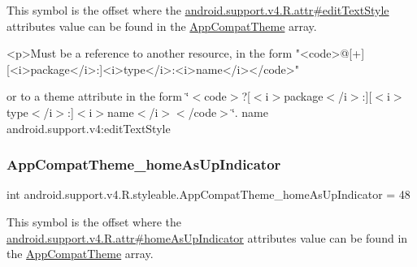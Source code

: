 This symbol is the offset where the \hyperlink{classandroid_1_1support_1_1v4_1_1R_1_1attr_a2a44b95ba45feb6b9848f66f16044f7d}{android.\+support.\+v4.\+R.\+attr\#edit\+Text\+Style} attribute\textquotesingle{}s value can be found in the \hyperlink{classandroid_1_1support_1_1v4_1_1R_1_1styleable_ac07ebbe62ed977f6dcaadc6397840ace}{App\+Compat\+Theme} array.

\begin{DoxyVerb}      <p>Must be a reference to another resource, in the form "<code>@[+][<i>package</i>:]<i>type</i>:<i>name</i></code>"
\end{DoxyVerb}
 or to a theme attribute in the form \char`\"{}$<$code$>$?\mbox{[}$<$i$>$package$<$/i$>$\+:\mbox{]}\mbox{[}$<$i$>$type$<$/i$>$\+:\mbox{]}$<$i$>$name$<$/i$>$$<$/code$>$\char`\"{}.  name android.\+support.\+v4\+:edit\+Text\+Style \mbox{\label{classandroid_1_1support_1_1v4_1_1R_1_1styleable_a99213e6dd1efe95a588f624e59528c4d}} 
\subsubsection{\texorpdfstring{App\+Compat\+Theme\+\_\+home\+As\+Up\+Indicator}{AppCompatTheme\_homeAsUpIndicator}}
{\footnotesize\ttfamily int android.\+support.\+v4.\+R.\+styleable.\+App\+Compat\+Theme\+\_\+home\+As\+Up\+Indicator = 48\hspace{0.3cm}{\ttfamily [static]}}

This symbol is the offset where the \hyperlink{classandroid_1_1support_1_1v4_1_1R_1_1attr_a97ae31144cbfcae435daedba111ed06d}{android.\+support.\+v4.\+R.\+attr\#home\+As\+Up\+Indicator} attribute\textquotesingle{}s value can be found in the \hyperlink{classandroid_1_1support_1_1v4_1_1R_1_1styleable_ac07ebbe62ed977f6dcaadc6397840ace}{App\+Compat\+Theme} array.


